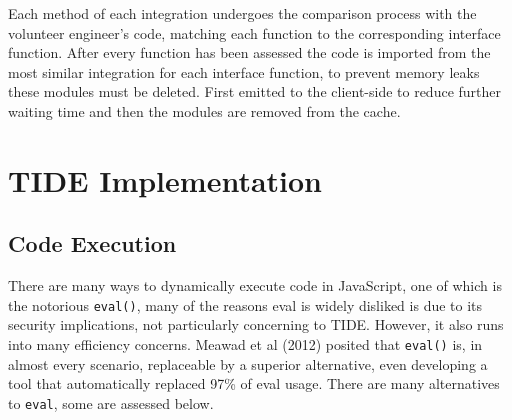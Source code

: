\documentclass[jou,apacite]{apa6}
\begin{document}
Each method of each integration undergoes the comparison process with the volunteer engineer's code, matching each function to the corresponding interface function. After every function has been assessed the code is imported from the most similar integration for each interface function, to prevent memory leaks these modules must be deleted. First emitted to the client-side to reduce further waiting time and then the modules are removed from the cache.

\section{TIDE Implementation}
\subsection{Code Execution}
There are many ways to dynamically execute code in JavaScript, one of which is the notorious \texttt{eval()}, many of the reasons eval is widely disliked is due to its security implications, not particularly concerning to TIDE. However,  it also runs into many efficiency concerns. Meawad et al (2012) posited that \texttt{eval()} is, in almost every scenario, replaceable by a superior alternative, even developing a tool that automatically replaced 97\% of eval usage. There are many alternatives to \texttt{eval}, some are assessed below.
\end{document}
